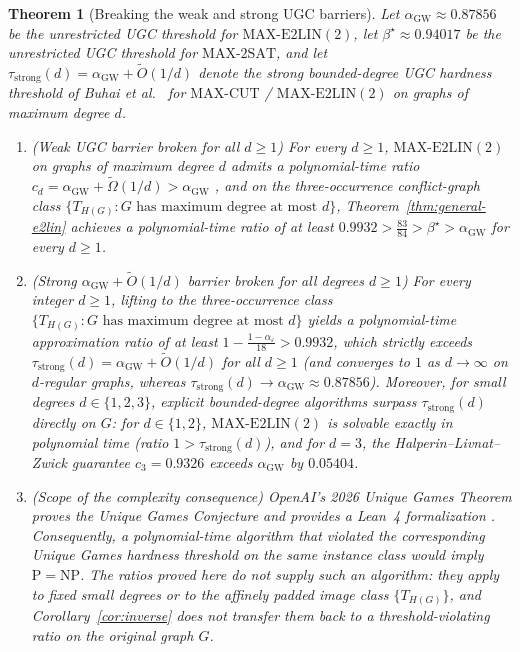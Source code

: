 \documentclass[pdflatex,sn-mathphys-num]{sn-jnl}%
\theoremstyle{thmstyleone}%
\newtheorem{Theorem}{Theorem}[section]
\theoremstyle{thmstyletwo}%
\theoremstyle{thmstylethree}%
\begin{document}
\begin{Theorem}[Breaking the weak and strong UGC barriers]\label{thm:strong-ugc-broken}
Let $\alpha_{\mathrm{GW}} \approx 0.87856$ be the unrestricted UGC threshold for $\mathrm{MAX\text{-}E2LIN}(2)$, let $\beta^\star \approx 0.94017$ be the unrestricted UGC threshold for $\mathrm{MAX\text{-}2SAT}$, and let $\tau_{\mathrm{strong}}(d) = \alpha_{\mathrm{GW}} + \widetilde{O}(1/d)$ denote the strong bounded-degree UGC hardness threshold of Buhai et al.~\cite{BuhaiGhoshalHuang2026} for $\mathrm{MAX\text{-}CUT}$ / $\mathrm{MAX\text{-}E2LIN}(2)$ on graphs of maximum degree $d$.
\begin{enumerate}
\item \emph{(Weak UGC barrier broken for all $d \ge 1$)} For every $d \ge 1$, $\mathrm{MAX\text{-}E2LIN}(2)$ on graphs of maximum degree $d$ admits a polynomial-time ratio $c_d = \alpha_{\mathrm{GW}} + \widetilde{\Omega}(1/d) > \alpha_{\mathrm{GW}}$ \cite{BuhaiGhoshalHuang2026}, and on the three-occurrence conflict-graph class $\{T_{H(G)} : G \text{ has maximum degree at most } d\}$, Theorem~\ref{thm:general-e2lin} achieves a polynomial-time ratio of at least $0.9932 > \frac{83}{84} > \beta^\star > \alpha_{\mathrm{GW}}$ for every $d \ge 1$.
\item \emph{(Strong $\alpha_{\mathrm{GW}} + \widetilde{O}(1/d)$ barrier broken for all degrees $d \ge 1$)} For every integer $d \ge 1$, lifting to the three-occurrence class $\{T_{H(G)} : G \text{ has maximum degree at most } d\}$ yields a polynomial-time approximation ratio of at least $1 - \frac{1-\alpha_\varepsilon}{18} > 0.9932$, which strictly exceeds $\tau_{\mathrm{strong}}(d) = \alpha_{\mathrm{GW}} + \widetilde{O}(1/d)$ for all $d \ge 1$ (and converges to $1$ as $d \to \infty$ on $d$-regular graphs, whereas $\tau_{\mathrm{strong}}(d) \to \alpha_{\mathrm{GW}} \approx 0.87856$). Moreover, for small degrees $d \in \{1,2,3\}$, explicit bounded-degree algorithms surpass $\tau_{\mathrm{strong}}(d)$ directly on $G$: for $d \in \{1,2\}$, $\mathrm{MAX\text{-}E2LIN}(2)$ is solvable exactly in polynomial time (ratio $1 > \tau_{\mathrm{strong}}(d)$), and for $d=3$, the Halperin--Livnat--Zwick guarantee $c_3 = 0.9326$ \cite{HalperinLivnatZwick2004} exceeds $\alpha_{\mathrm{GW}}$ by $0.05404$.
\item \emph{(Scope of the complexity consequence)} OpenAI's 2026 Unique Games Theorem proves the Unique Games Conjecture and provides a Lean~4 formalization \cite{OpenAIMath2026}. Consequently, a polynomial-time algorithm that violated the corresponding Unique Games hardness threshold on the same instance class would imply $\mathrm{P}=\mathrm{NP}$. The ratios proved here do not supply such an algorithm: they apply to fixed small degrees or to the affinely padded image class $\{T_{H(G)}\}$, and Corollary~\ref{cor:inverse} does not transfer them back to a threshold-violating ratio on the original graph $G$.
\end{enumerate}
\end{Theorem}
\end{document}
